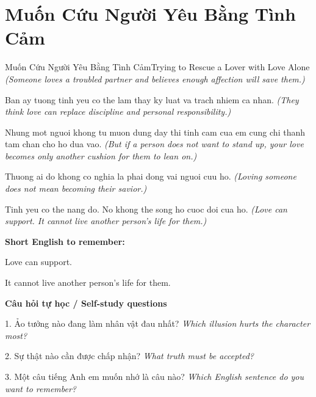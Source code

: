 \section{Muốn Cứu Người Yêu Bằng Tình Cảm}
\begin{truyen}{Muốn Cứu Người Yêu Bằng Tình Cảm}{Trying to Rescue a Lover with Love Alone}
\textit{(Someone loves a troubled partner and believes enough affection will save them.)}

Ban ay tuong tinh yeu co the lam thay ky luat va trach nhiem ca nhan.
\textit{(They think love can replace discipline and personal responsibility.)}

Nhung mot nguoi khong tu muon dung day thi tinh cam cua em cung chi thanh tam chan cho ho dua vao.
\textit{(But if a person does not want to stand up, your love becomes only another cushion for them to lean on.)}

Thuong ai do khong co nghia la phai dong vai nguoi cuu ho.
\textit{(Loving someone does not mean becoming their savior.)}

\end{truyen}

\begin{baihoc}
Tinh yeu co the nang do. No khong the song ho cuoc doi cua ho.
\textit{(Love can support. It cannot live another person’s life for them.)}
\end{baihoc}

\begin{ghinhoanh}
\textbf{Short English to remember:}

Love can support.

It cannot live another person’s life for them.

\end{ghinhoanh}

\begin{tuhocnhanh}
\textbf{Câu hỏi tự học / Self-study questions}

1. Ảo tưởng nào đang làm nhân vật đau nhất? \textit{Which illusion hurts the character most?}

2. Sự thật nào cần được chấp nhận? \textit{What truth must be accepted?}

3. Một câu tiếng Anh em muốn nhớ là câu nào? \textit{Which English sentence do you want to remember?}
\end{tuhocnhanh}
\ngancach

